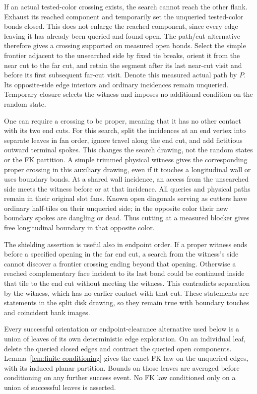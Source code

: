 If an actual tested-color crossing exists, the search cannot reach
the other flank. Exhaust its reached component and temporarily set
the unqueried tested-color bonds closed. This does not enlarge the
reached component, since every edge leaving it has already been
queried and found open. The path/cut alternative therefore gives a
crossing supported on measured open bonds. Select the simple frontier
adjacent to the unsearched side by fixed tie breaks, orient it from
the near cut to the far cut, and retain the segment after its last
near-cut visit and before its first subsequent far-cut visit. Denote
this measured actual path by $P$. Its opposite-side edge interiors
and ordinary incidences remain unqueried. Temporary closure selects
the witness and imposes no additional condition on the random state.

One can require a crossing to be proper, meaning that it has no other
contact with its two end cuts. For this search, split the incidences at
an end vertex into separate leaves in fan order, ignore travel along
the end cut, and add fictitious outward terminal spokes. This changes
the search drawing, not the random states or the FK partition. A
simple trimmed physical witness gives the corresponding proper
crossing in this auxiliary drawing, even if it touches a longitudinal
wall or uses boundary bonds. At a shared wall incidence, an access
from the unsearched side meets the witness before or at that incidence.
All queries and physical paths remain in their original slot fans.
Known open diagonals serving as cutters have ordinary
half-tiles on their unqueried side; in the opposite color their new
boundary spokes are dangling or dead. Thus cutting at a measured
blocker gives free longitudinal boundary in that opposite color.

The shielding assertion is useful also in endpoint order. If a proper
witness ends before a specified opening in the far end cut, a search
from the witness's side cannot discover a frontier crossing ending
beyond that opening. Otherwise a reached complementary face incident
to its last bond could be continued inside that tile to the end cut
without meeting the witness. This contradicts separation by the
witness, which has no earlier contact with that cut. These statements
are statements in the split disk drawing, so they remain true with
boundary touches and coincident bank images.

Every successful orientation or endpoint-clearance alternative used
below is a union of leaves of its own deterministic edge exploration.
On an individual leaf, delete the queried closed edges and contract
the queried open components. Lemma~\ref{lem:finite-conditioning} gives
the exact FK law on the unqueried edges, with its induced planar
partition. Bounds on those leaves are averaged before conditioning on
any further success event. No FK law conditioned only on a union of
successful leaves is asserted.

